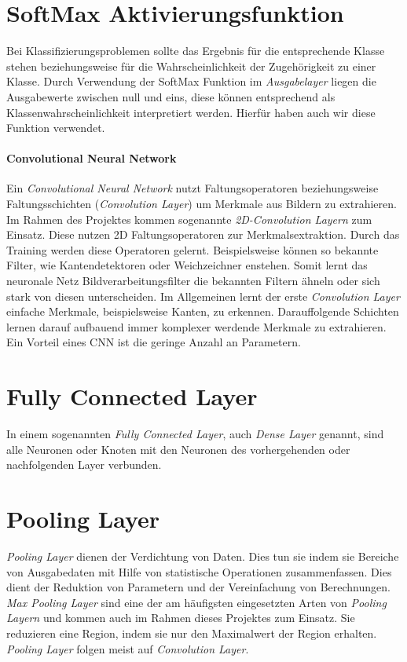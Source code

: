 \documentclass[11pt]{article}
\begin{document}
\chapter{SoftMax Aktivierungsfunktion}
Bei Klassifizierungsproblemen sollte das Ergebnis für die entsprechende Klasse stehen beziehungsweise für die Wahrscheinlichkeit der Zugehörigkeit zu einer Klasse. Durch Verwendung der SoftMax Funktion im \textit{Ausgabelayer} liegen die Ausgabewerte zwischen null und eins, diese können entsprechend als Klassenwahrscheinlichkeit interpretiert werden. Hierfür haben auch wir diese Funktion verwendet. \parencite{AndreasLindholmNiklasWahlstromFredrikLindsten2019}

\subsubsection{Convolutional Neural Network}
Ein \textit{Convolutional Neural Network} nutzt Faltungsoperatoren beziehungsweise Faltungsschichten (\textit{Convolution Layer}) um Merkmale aus Bildern zu extrahieren. Im Rahmen des Projektes kommen sogenannte \textit{2D-Convolution Layern} zum Einsatz. Diese nutzen 2D Faltungsoperatoren zur Merkmalsextraktion. Durch das Training werden diese Operatoren gelernt. Beispielsweise können so bekannte Filter, wie Kantendetektoren oder Weichzeichner enstehen. Somit lernt das neuronale Netz Bildverarbeitungsfilter die bekannten Filtern ähneln oder sich stark von diesen unterscheiden. Im Allgemeinen lernt der erste \textit{Convolution Layer} einfache Merkmale, beispielsweise Kanten, zu erkennen. Darauffolgende Schichten lernen darauf aufbauend immer komplexer werdende Merkmale zu extrahieren. Ein Vorteil eines CNN ist die geringe Anzahl an Parametern.\parencite{Pattanayak2017}

\chapter{Fully Connected Layer}
In einem sogenannten \textit{Fully Connected Layer}, auch \textit{Dense Layer} genannt, sind alle Neuronen oder Knoten mit den Neuronen des vorhergehenden oder nachfolgenden Layer verbunden.\parencite{Pattanayak2017}

\chapter{Pooling Layer}
\textit{Pooling Layer} dienen der Verdichtung von Daten. Dies tun sie indem sie Bereiche von Ausgabedaten mit Hilfe von statistische Operationen zusammenfassen. Dies dient der Reduktion von Parametern und der Vereinfachung von Berechnungen.  \textit{Max Pooling Layer} sind eine der am häufigsten eingesetzten Arten von \textit{Pooling Layern} und kommen auch im Rahmen dieses Projektes zum Einsatz. Sie reduzieren eine Region, indem sie nur den Maximalwert der Region erhalten. \textit{Pooling Layer} folgen meist auf \textit{Convolution Layer}.\parencite{Karpathy}\parencite{IanGoodfellowYoshuaBengio2016}
\end{document}
